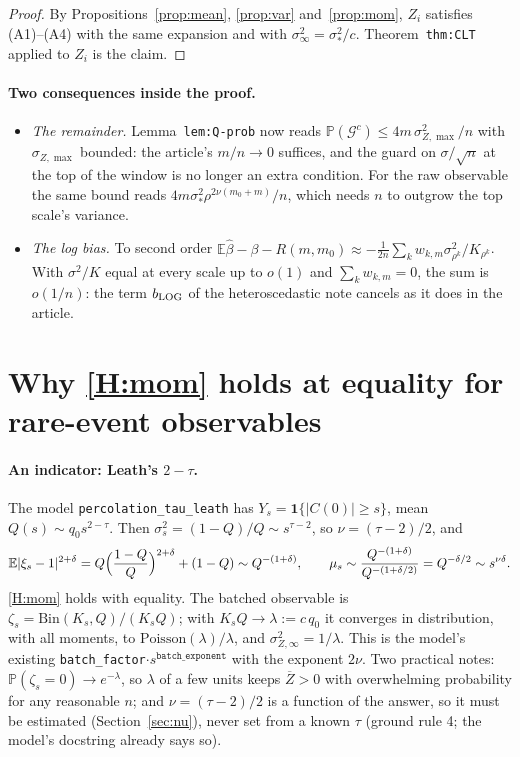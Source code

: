 \documentclass[11pt]{article}
\newcommand{\E}{\mathbb{E}}
\newcommand{\Prob}{\mathbb{P}}
\newcommand{\lbl}[1]{\texttt{#1}}
\begin{document}
\begin{proof}
By Propositions~\ref{prop:mean}, \ref{prop:var} and~\ref{prop:mom}, $Z_i$
satisfies (A1)--(A4) with the same expansion and with
$\sigma_\infty^2=\sigma_*^2/c$. Theorem~\lbl{thm:CLT} applied to $Z_i$ is the
claim.
\end{proof}

\paragraph{Two consequences inside the proof.}
\begin{itemize}
  \item \emph{The remainder.} Lemma~\lbl{lem:Q-prob} now reads
  $\Prob(\mathcal G^c)\le4m\,\sigma_{Z,\max}^2/n$ with $\sigma_{Z,\max}$ bounded:
  the article's $m/n\to0$ suffices, and the guard on $\sigma/\sqrt n$ at the top
  of the window is no longer an extra condition. For the raw observable the same
  bound reads $4m\sigma_*^2\rho^{2\nu(m_0+m)}/n$, which needs $n$ to outgrow the
  top scale's variance.
  \item \emph{The log bias.} To second order
  $\E\hat\beta-\beta-R(m,m_0)\approx-\frac1{2n}\sum_kw_{k,m}\sigma_{\rho^k}^2/K_{\rho^k}$.
  With $\sigma^2/K$ equal at every scale up to $o(1)$ and $\sum_kw_{k,m}=0$, the
  sum is $o(1/n)$: the term $b_{\rm LOG}$ of the heteroscedastic note cancels
  as it does in the article.
\end{itemize}

\section{Why \texorpdfstring{\ref{H:mom}}{H2} holds at equality for rare-event observables}\label{sec:H2}

\paragraph{An indicator: Leath's $2-\tau$.}
The model \texttt{percolation\_tau\_leath} has
$Y_s=\mathbf 1\{|C(0)|\ge s\}$, mean $Q(s)\sim q_0s^{2-\tau}$. Then
$\sigma_s^2=(1-Q)/Q\sim s^{\tau-2}$, so $\nu=(\tau-2)/2$, and
\[
  \E|\xi_s-1|^{2+\delta}=Q\Bigl(\frac{1-Q}{Q}\Bigr)^{2+\delta}+(1-Q)
  \sim Q^{-(1+\delta)},
  \qquad
  \mu_s\sim\frac{Q^{-(1+\delta)}}{Q^{-(1+\delta/2)}}=Q^{-\delta/2}\sim s^{\nu\delta}.
\]
\ref{H:mom} holds with equality. The batched observable is
$\zeta_s=\mathrm{Bin}(K_s,Q)/(K_sQ)$; with $K_sQ\to\lambda:=c\,q_0$ it converges
in distribution, with all moments, to $\mathrm{Poisson}(\lambda)/\lambda$, and
$\sigma_{Z,\infty}^2=1/\lambda$. This is the model's existing
\texttt{batch\_factor}$\cdot s^{\texttt{batch\_exponent}}$ with the exponent
$2\nu$. Two practical notes: $\Prob(\zeta_s=0)\to e^{-\lambda}$, so $\lambda$
of a few units keeps $\overline Z>0$ with overwhelming probability for any
reasonable $n$; and $\nu=(\tau-2)/2$ is a function of the answer, so it must be
estimated (Section~\ref{sec:nu}), never set from a known $\tau$ (ground rule 4;
the model's docstring already says so).
\end{document}
